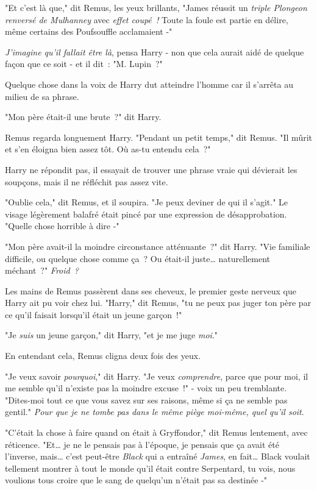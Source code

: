 "Et c'est là que," dit Remus, les yeux brillants, "James réussit un \emph{triple Plongeon renversé de Mulhanney} avec \emph{effet coupé~!} Toute la foule est partie en délire, même certains des Poufsouffle acclamaient -"

\emph{J'imagine qu'il fallait être là}, pensa Harry - non que cela aurait aidé de quelque façon que ce soit - et il dit~: "M. Lupin~?"

Quelque chose dans la voix de Harry dut atteindre l'homme car il s'arrêta au milieu de sa phrase.

"Mon père était-il une brute~?" dit Harry.

Remus regarda longuement Harry. "Pendant un petit temps," dit Remus. "Il mûrit et s'en éloigna bien assez tôt. Où as-tu entendu cela~?"

Harry ne répondit pas, il essayait de trouver une phrase vraie qui dévierait les soupçons, mais il ne réfléchit pas assez vite.

"Oublie cela," dit Remus, et il soupira. "Je peux deviner de qui il s'agit." Le visage légèrement balafré était pincé par une expression de désapprobation. "Quelle chose horrible à dire -"

"Mon père avait-il la moindre circonstance atténuante~?" dit Harry. "Vie familiale difficile, ou quelque chose comme ça~? Ou était-il juste… naturellement méchant~?" \emph{Froid~?}

Les mains de Remus passèrent dans ses cheveux, le premier geste nerveux que Harry ait pu voir chez lui. "Harry," dit Remus, "tu ne peux pas juger ton père par ce qu'il faisait lorsqu'il était un jeune garçon~!"

"Je \emph{suis} un jeune garçon," dit Harry, "et je me juge \emph{moi}."

En entendant cela, Remus cligna deux fois des yeux.

"Je veux savoir \emph{pourquoi}," dit Harry. "Je veux \emph{comprendre}, parce que pour moi, il me semble qu'il n'existe pas la moindre excuse~!" - voix un peu tremblante. "Dites-moi tout ce que vous savez sur ses raisons, même si ça ne semble pas gentil." \emph{Pour que je ne tombe pas dans le même piège moi-même, quel qu'il soit}.

"C'était la chose à faire quand on était à Gryffondor," dit Remus lentement, avec réticence. "Et… je ne le pensais pas à l'époque, je pensais que ça avait été l'inverse, mais… c'est peut-être \emph{Black} qui a entraîné \emph{James}, en fait… Black voulait tellement montrer à tout le monde qu'il était contre Serpentard, tu vois, nous voulions tous croire que le sang de quelqu'un n'était pas sa destinée -"

